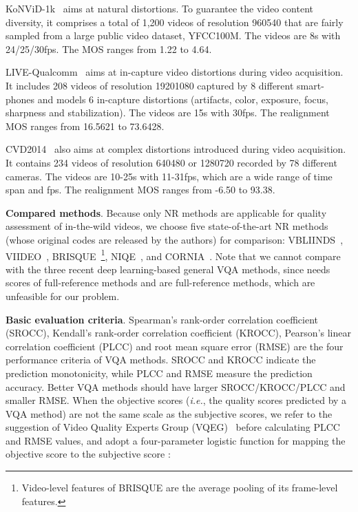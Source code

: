 \documentclass[sigconf]{acmart}
\begin{document}
KoNViD-1k~\cite{hosu2017konstanz} aims at natural distortions. To guarantee the video content diversity, it comprises a total of 1,200 videos of resolution 960540 that are fairly sampled from a large public video dataset, YFCC100M. The videos are 8s with 24/25/30fps. The MOS ranges from 1.22 to 4.64.

LIVE-Qualcomm~\cite{ghadiyaram2018capture} aims at in-capture video distortions during video acquisition. It includes 208 videos of resolution 19201080 captured by 8 different smart-phones and models 6 in-capture distortions (artifacts, color, exposure, focus, sharpness and stabilization). The videos are 15s with 30fps. The realignment MOS ranges from 16.5621 to 73.6428.

CVD2014~\cite{nuutinen2016cvd2014} also aims at complex distortions introduced during video acquisition. It contains 234 videos of resolution 640480 or 1280720 recorded by 78 different cameras. The videos are 10-25s with 11-31fps, which are a wide range of time span and fps. The realignment MOS ranges from -6.50 to 93.38.

\textbf{Compared methods}. Because only NR methods are applicable for quality assessment of in-the-wild videos, we choose five state-of-the-art NR methods (whose original codes are released by the authors) for comparison: VBLIINDS~\cite{saad2014blind}, VIIDEO~\cite{mittal2016completely}, BRISQUE~\cite{mittal2012no}\footnote{Video-level features of BRISQUE are the average pooling of its frame-level features.}, NIQE~\cite{mittal2013making}, and CORNIA~\cite{ye2012unsupervised}. Note that we cannot compare with the three recent deep learning-based general VQA methods, since \cite{zhang2018blind} needs scores of full-reference methods and \cite{kim2018deep,zhang2019objective} are full-reference methods, which are unfeasible for our problem.

\textbf{Basic evaluation criteria}. Spearman's rank-order correlation coefficient (SROCC), Kendall's rank-order correlation coefficient (KROCC), Pearson's linear correlation coefficient (PLCC) and root mean square error (RMSE) are the four performance criteria of VQA methods. SROCC and KROCC indicate the prediction monotonicity, while PLCC and RMSE measure the prediction accuracy. Better VQA methods should have larger SROCC/KROCC/PLCC and smaller RMSE. When the objective scores (\textit{i.e.},  the quality scores predicted by a VQA method) are not the same scale as the subjective scores, we refer to the suggestion of Video Quality Experts Group (VQEG)~\cite{vqeg2000fr} before calculating PLCC and RMSE values, and adopt a four-parameter logistic function for mapping the objective score  to the subjective score :
\end{document}
